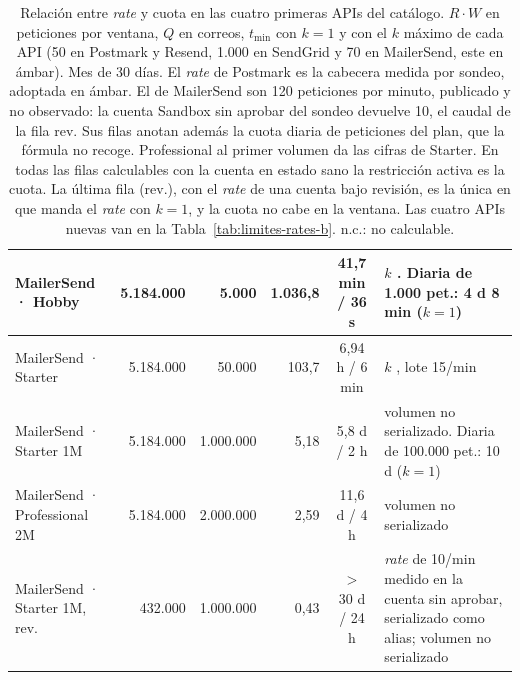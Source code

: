 \begin{table}[H]
\begin{tabular}{|l|r|r|r|c|p{3.2cm}|}
\hline
MailerSend · Hobby & 5.184.000 & 5.000 & 1.036,8 & 41,7 min / 36 s & $k$ \semambar{}. Diaria de 1.000 pet.: 4 d 8 min ($k{=}1$) \\
\hline
MailerSend · Starter & 5.184.000 & 50.000 & 103,7 & 6,94 h / 6 min & $k$ \semambar{}, lote 15/min \semverde{} \\
\hline
MailerSend · Starter 1M & 5.184.000 & 1.000.000 & 5,18 & 5,8 d / 2 h & volumen no serializado. Diaria de 100.000 pet.: 10 d ($k{=}1$) \\
\hline
MailerSend · Professional 2M & 5.184.000 & 2.000.000 & 2,59 & 11,6 d / 4 h & volumen no serializado \\
\hline
MailerSend · Starter 1M, rev. & 432.000 & 1.000.000 & 0,43 & $>$ 30 d / 24 h & \textit{rate} de 10/min medido en la cuenta sin aprobar, serializado como alias; volumen no serializado \\
\hline
\end{tabular}
\caption{Relación entre \textit{rate} y cuota en las cuatro primeras APIs del catálogo. $R \cdot W$ en peticiones por ventana, $Q$ en correos, $t_{\min}$ con $k = 1$ y con el $k$ máximo de cada API (50 en Postmark y Resend, 1.000 en SendGrid y 70 en MailerSend, este en ámbar). Mes de 30 días. El \textit{rate} de Postmark es la cabecera medida por sondeo, adoptada en ámbar. El de MailerSend son 120 peticiones por minuto, publicado y no observado: la cuenta Sandbox sin aprobar del sondeo devuelve 10, el caudal de la fila rev. Sus filas anotan además la cuota diaria de peticiones del plan, que la fórmula no recoge. Professional al primer volumen da las cifras de Starter. En todas las filas calculables con la cuenta en estado sano la restricción activa es la cuota. La última fila (rev.), con el \textit{rate} de una cuenta bajo revisión, es la única en que manda el \textit{rate} con $k = 1$, y la cuota no cabe en la ventana. Las cuatro APIs nuevas van en la Tabla~\ref{tab:limites-rates-b}. n.c.: no calculable.}
\label{tab:limites-rates}
\end{table}

